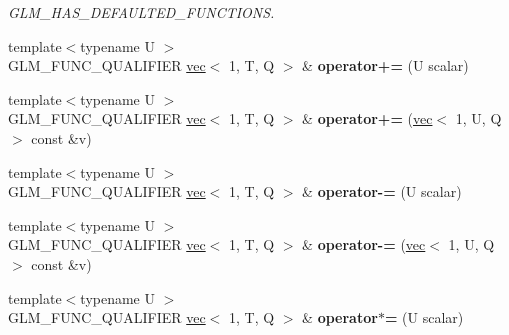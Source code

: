 \begin{DoxyCompactItemize}
\begin{DoxyCompactList}\small\item\em G\+L\+M\+\_\+\+H\+A\+S\+\_\+\+D\+E\+F\+A\+U\+L\+T\+E\+D\+\_\+\+F\+U\+N\+C\+T\+I\+O\+NS. \end{DoxyCompactList}\item 
\mbox{\label{structglm_1_1vec_3_011_00_01T_00_01Q_01_4_aefbc9c1c018abcb5c7e6ebe8c1d1fc1f}} 
{\footnotesize template$<$typename U $>$ }\\G\+L\+M\+\_\+\+F\+U\+N\+C\+\_\+\+Q\+U\+A\+L\+I\+F\+I\+ER \hyperlink{structglm_1_1vec}{vec}$<$ 1, T, Q $>$ \& {\bfseries operator+=} (U scalar)
\item 
\mbox{\label{structglm_1_1vec_3_011_00_01T_00_01Q_01_4_a6af79bf388e7df43ec8935271207d6fc}} 
{\footnotesize template$<$typename U $>$ }\\G\+L\+M\+\_\+\+F\+U\+N\+C\+\_\+\+Q\+U\+A\+L\+I\+F\+I\+ER \hyperlink{structglm_1_1vec}{vec}$<$ 1, T, Q $>$ \& {\bfseries operator+=} (\hyperlink{structglm_1_1vec}{vec}$<$ 1, U, Q $>$ const \&v)
\item 
\mbox{\label{structglm_1_1vec_3_011_00_01T_00_01Q_01_4_ad8f1f7c45247e319031b4763b1b5d8e5}} 
{\footnotesize template$<$typename U $>$ }\\G\+L\+M\+\_\+\+F\+U\+N\+C\+\_\+\+Q\+U\+A\+L\+I\+F\+I\+ER \hyperlink{structglm_1_1vec}{vec}$<$ 1, T, Q $>$ \& {\bfseries operator-\/=} (U scalar)
\item 
\mbox{\label{structglm_1_1vec_3_011_00_01T_00_01Q_01_4_af7f71fdf4777a81e3c86efae282ca96e}} 
{\footnotesize template$<$typename U $>$ }\\G\+L\+M\+\_\+\+F\+U\+N\+C\+\_\+\+Q\+U\+A\+L\+I\+F\+I\+ER \hyperlink{structglm_1_1vec}{vec}$<$ 1, T, Q $>$ \& {\bfseries operator-\/=} (\hyperlink{structglm_1_1vec}{vec}$<$ 1, U, Q $>$ const \&v)
\item 
\mbox{\label{structglm_1_1vec_3_011_00_01T_00_01Q_01_4_a40577d349a0b2aa9cb5e8f516be56f5b}} 
{\footnotesize template$<$typename U $>$ }\\G\+L\+M\+\_\+\+F\+U\+N\+C\+\_\+\+Q\+U\+A\+L\+I\+F\+I\+ER \hyperlink{structglm_1_1vec}{vec}$<$ 1, T, Q $>$ \& {\bfseries operator$\ast$=} (U scalar)

\end{DoxyCompactItemize}
